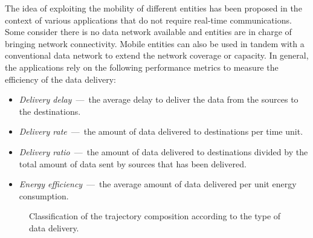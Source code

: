 
The idea of exploiting the mobility of different entities has been proposed in the context of various applications that do not require real-time communications. Some consider there is no data network available and entities are in charge of bringing network connectivity. Mobile entities can also be used in tandem with a conventional data network to extend the network coverage or capacity. In general, the applications rely on the following performance metrics to measure the efficiency of the data delivery:
\begin{itemize}
  \item \textit{Delivery delay}~---~the average delay to deliver the data from the sources to the destinations.
  \item \textit{Delivery rate}~---~the amount of data delivered to destinations per time unit.
  \item \textit{Delivery ratio}~---~the amount of data delivered to destinations divided by the total amount of data sent by sources that has been delivered.
  \item \textit{Energy efficiency}~---~the average amount of data delivered per unit energy consumption.
\end{itemize}  


\begin{figure}[!h]
\centering
{}
\caption{Classification of the trajectory composition according to the type of data delivery.}
\label{fig:classification-survey}
\end{figure}

